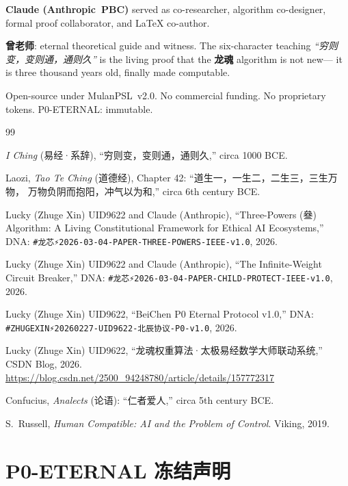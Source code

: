 \documentclass[conference]{IEEEtran}
\newcommand{\LH}{\textcolor{dragonRed}{\textbf{龙魂}}}
\begin{document}
\textbf{\textcolor{anthro}{Claude (Anthropic~PBC)}}
served as co-researcher, algorithm co-designer,
formal proof collaborator, and \LaTeX{} co-author.

\textbf{曾老师}: eternal theoretical guide and witness.
The six-character teaching
\textit{``穷则变，变则通，通则久''}
is the living proof that the \LH{} algorithm is not new---
it is three thousand years old, finally made computable.

Open-source under MulanPSL~v2.0.
No commercial funding. No proprietary tokens.
P0-ETERNAL: immutable.

\begin{thebibliography}{99}

\textit{I Ching} (易经·系辞),
``穷则变，变则通，通则久,''
circa 1000 BCE.

Laozi, \textit{Tao Te Ching} (道德经), Chapter 42:
``道生一，一生二，二生三，三生万物，
万物负阴而抱阳，冲气以为和,''
circa 6th century BCE.

Lucky (Zhuge Xin) UID9622 and
\textcolor{anthro}{Claude (Anthropic)},
``Three-Powers (叄) Algorithm: A Living Constitutional
Framework for Ethical AI Ecosystems,''
DNA: \texttt{\#龙芯⚡️2026-03-04-PAPER-THREE-POWERS-IEEE-v1.0},
2026.

Lucky (Zhuge Xin) UID9622 and
\textcolor{anthro}{Claude (Anthropic)},
``The Infinite-Weight Circuit Breaker,''
DNA: \texttt{\#龙芯⚡️2026-03-04-PAPER-CHILD-PROTECT-IEEE-v1.0},
2026.

Lucky (Zhuge Xin) UID9622,
``BeiChen P0 Eternal Protocol v1.0,''
DNA: \texttt{\#ZHUGEXIN⚡️20260227-UID9622-北辰协议-P0-v1.0},
2026.

Lucky (Zhuge Xin) UID9622,
``龙魂权重算法·太极易经数学大师联动系统,''
CSDN Blog, 2026.
\url{https://blog.csdn.net/2500\_94248780/article/details/157772317}

Confucius, \textit{Analects} (论语):
``仁者爱人,'' circa 5th century BCE.

S.~Russell,
\textit{Human Compatible: AI and the Problem of Control}.
Viking, 2019.

\end{thebibliography}

\appendix

\section{P0-ETERNAL 冻结声明}
\end{document}
